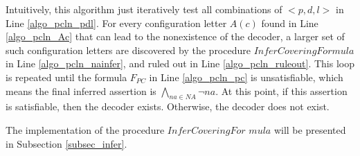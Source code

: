 \documentclass[journal]{IEEEtran}
\begin{document}
%
%
%
%

Intuitively,
this algorithm just iteratively test all combinations of $<p,d,l>$ in Line \ref{algo_pcln_pdl}.
For every configuration letter $A(c)$ found in Line \ref{algo_pcln_Ac} that can lead to the nonexistence of the decoder,
a larger set of such configuration letters are discovered by the procedure $InferCoveringFormula$ in Line \ref{algo_pcln_nainfer},
and ruled out in Line \ref{algo_pcln_ruleout}.
This loop is repeated until the formula $F_{PC}$ in Line \ref{algo_pcln_pc} is unsatisfiable,
which means the final inferred assertion is $\bigwedge_{na\in NA}\neg na$.
At this point,
if this assertion is satisfiable,
then the decoder exists.
Otherwise,
the decoder does not exist.

The implementation of the procedure $InferCoveringFor$ $mula$ will be presented in Subsection \ref{subsec_infer}.
\end{document}
